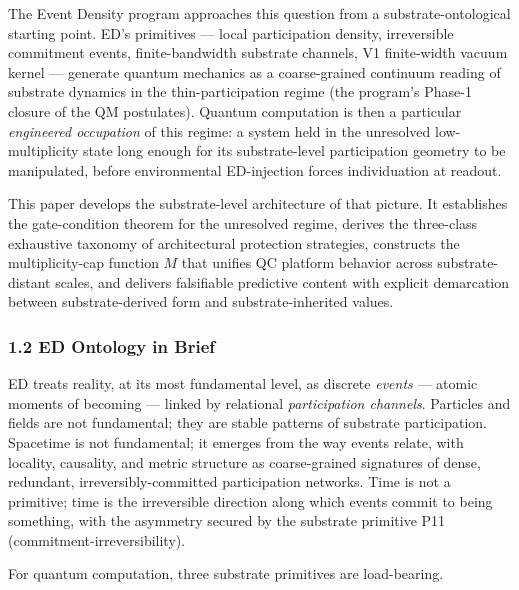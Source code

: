 \documentclass[
  11pt,
  a4paper,
]{article}
\begin{document}
The Event Density program approaches this question from a
substrate-ontological starting point. ED's primitives --- local
participation density, irreversible commitment events, finite-bandwidth
substrate channels, V1 finite-width vacuum kernel --- generate quantum
mechanics as a coarse-grained continuum reading of substrate dynamics in
the thin-participation regime (the program's Phase-1 closure of the QM
postulates). Quantum computation is then a particular \emph{engineered
occupation} of this regime: a system held in the unresolved
low-multiplicity state long enough for its substrate-level participation
geometry to be manipulated, before environmental ED-injection forces
individuation at readout.

This paper develops the substrate-level architecture of that picture. It
establishes the gate-condition theorem for the unresolved regime,
derives the three-class exhaustive taxonomy of architectural protection
strategies, constructs the multiplicity-cap function \(M\) that unifies
QC platform behavior across substrate-distant scales, and delivers
falsifiable predictive content with explicit demarcation between
substrate-derived form and substrate-inherited values.

\subsubsection{1.2 ED Ontology in Brief}\label{ed-ontology-in-brief}

ED treats reality, at its most fundamental level, as discrete
\emph{events} --- atomic moments of becoming --- linked by relational
\emph{participation channels}. Particles and fields are not fundamental;
they are stable patterns of substrate participation. Spacetime is not
fundamental; it emerges from the way events relate, with locality,
causality, and metric structure as coarse-grained signatures of dense,
redundant, irreversibly-committed participation networks. Time is not a
primitive; time is the irreversible direction along which events commit
to being something, with the asymmetry secured by the substrate
primitive P11 (commitment-irreversibility).

For quantum computation, three substrate primitives are load-bearing.
\end{document}
